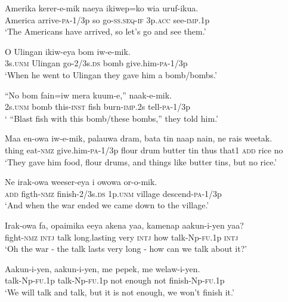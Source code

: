 \ea
\gll  Amerika  kerer-e-mik  naeya  ikiwep=ko  wia  uruf-ikua. \\
America  arrive-\textsc{pa}-1/3p  so  go-\textsc{ss.seq}-\textsc{if}  3p.\textsc{acc}  see-\textsc{imp}.1p \\
\glt ‘The Americans have arrived, so let’s go and see them.’ \\
\z


\ea
\gll  O  Ulingan  ikiw-eya  bom  iw-e-mik. \\
3s.\textsc{unm}  Ulingan  go-2/3s.\textsc{ds}  bomb  give.him-\textsc{pa}-1/3p \\
\glt ‘When he went to Ulingan they gave him a bomb/bombs.’ \\
\z


\ea
\gll  “No  bom  fain=iw  mera  kuum-e,”  naak-e-mik. \\
2s.\textsc{unm}  bomb  this-\textsc{inst}  fish  burn-\textsc{imp}.2s  tell-\textsc{pa}-1/3p \\
\glt ‘ “Blast fish with this bomb/these bombs,” they told him.’ \\
\z


\ea
\gll  Maa  en-owa  iw-e-mik,  palauwa  dram,    bata  tin  naap  nain,  ne  rais  weetak. \\
thing  eat-\textsc{nmz}  give.him-\textsc{pa}-1/3p  flour  drum   butter  tin  thus  that1  \textsc{add}  rice  no \\


\glt ‘They gave him food, flour drums, and things like butter tins, but no rice.’ \\
\z


\ea
\gll  Ne  irak-owa  weeser-eya  i  owowa  or-o-mik. \\
\textsc{add}  figth-\textsc{nmz}  finish-2/3s.\textsc{ds}  1p.\textsc{unm}  village  descend-\textsc{pa}-1/3p \\
\glt ‘And when the war ended we came down to the village.’ \\
\z


\ea
\gll  Irak-owa  fa,  opaimika  eeya  akena  yaa,  kamenap  aakun-i-yen  yaa? \\
fight-\textsc{nmz}  \textsc{intj}  talk  long.lasting  very  \textsc{intj}  how       talk-Np-\textsc{fu}.1p  \textsc{intj} \\


\glt ‘Oh the war - the talk lasts very long - how can we talk about it?’ \\
\z


\ea
\gll  Aakun-i-yen,  aakun-i-yen,  me  pepek,  me  welaw-i-yen. \\
talk-Np-\textsc{fu}.1p  talk-Np-\textsc{fu}.1p  not  enough  not  finish-Np-\textsc{fu}.1p \\
\glt ‘We will talk and talk, but it is not enough, we won’t finish it.’ \\
\z

